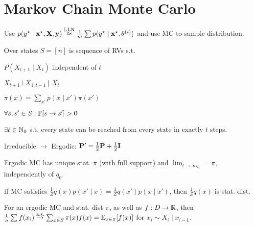 \section{Markov Chain Monte Carlo}

\begin{definition}[Idea]
    Use \(p(y^\star \mid \x^\star, \X, \y) \overset{\text{LLN}}{\approx} \frac{1}{m}\sum p(y^\star \mid \x^\star, \theta^{(i)})\)
    and use MC to sample distribution.
\end{definition}

\begin{definition}[MC]
    Over states \(S = [n]\) is sequence of RVs s.t.
    \begin{itemize*}
        \item \(P(X_{t+1} \mid X_t)\) independent of \(t\)
        \item \(X_{t+1} \bot X_{1:t-1} \mid X_t\)
    \end{itemize*}
\end{definition}

\begin{definition}[Stationary]
    \(\pi(x) = \sum_{x'} p(x \mid x')\pi(x')\)
\end{definition}

\begin{definition}[Irreducible]
    \(\forall s, s' \in S: \P[s \to s'] > 0\)
\end{definition}

\begin{definition}[Ergodic]
    \(\exists t \in \N_0\) s.t. every state can be reached from every state in exactly \(t\) steps.
\end{definition}

Irreducible \(\to\) Ergodic: \(\PM' = \frac{1}{2}\PM + \frac{1}{2}\I\)

\begin{colored}
    Ergodic MC has unique stat. \(\pi\) (with full support) and \(\lim_{t \to \infty q_t} = \pi\), independently of \(q_0\).
\end{colored}

\begin{definition}
    If MC satisfies \(\frac{1}{Z}q(x)p(x'\mid x) = \frac{1}{Z}q(x')p(x \mid x')\), then \(\frac{1}{Z}q(x)\) is stat. dist.
\end{definition}

\begin{definition}
    For an ergodic MC and stat. dist \(\pi\), as well as \(f: D \to \R\), then \(\frac{1}{n} \sum f(x_i) \overset{\text{a.s.}}{\to} \sum_{x \in S} \pi(x)f(x) = \E_{x \in \pi}[f(x)]\) for \(x_i \sim X_i \mid x_{i-1}\).
\end{definition}

